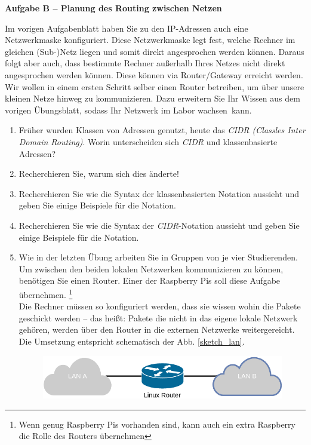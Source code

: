 \documentclass[paper=a4,fontsize=11pt]{scrartcl}%
\numberwithin{equation}{section}
\begin{document}
\begin{center}
\Large{\textbf{Aufgabe B -- Planung des Routing zwischen Netzen}}
\end{center}
\vskip0.25in
Im vorigen Aufgabenblatt haben Sie zu den IP-Adressen auch eine Netzwerkmaske konfiguriert. Diese Netzwerkmaske legt fest, welche Rechner im gleichen (Sub-)Netz liegen und somit direkt angesprochen werden können. Daraus folgt aber auch, dass bestimmte Rechner außerhalb Ihres Netzes nicht direkt angesprochen werden können. Diese können via Router/Gateway erreicht werden.\\
Wir wollen in einem ersten Schritt selber einen Router betreiben, um über unsere kleinen Netze hinweg zu kommunizieren. Dazu erweitern Sie Ihr Wissen aus dem vorigen Übungsblatt, sodass Ihr Netzwerk im Labor \glqq wachsen\grqq\ kann.
\begin{enumerate}
	\item Früher wurden Klassen von Adressen genutzt, heute das \emph{CIDR (Classles Inter Domain Routing)}. Worin unterscheiden sich \emph{CIDR} und klassenbasierte Adressen?
	\item Recherchieren Sie, warum sich dies änderte!
	\item Recherchieren Sie wie die Syntax der klassenbasierten Notation aussieht und geben Sie einige Beispiele für die Notation.
	\item Recherchieren Sie wie die Syntax der \emph{CIDR}-Notation aussieht und geben Sie einige Beispiele für die Notation.
	\item Wie in der letzten Übung arbeiten Sie in Gruppen von je vier Studierenden.\\
	Um zwischen den beiden lokalen Netzwerken kommunizieren zu können, benötigen Sie einen Router. Einer der Raspberry Pis  soll diese Aufgabe übernehmen. \footnote{Wenn genug Raspberry Pis vorhanden sind, kann auch ein extra Raspberry die Rolle des Routers übernehmen}\\
	Die Rechner müssen so konfiguriert werden, dass sie wissen wohin die Pakete geschickt werden -- das heißt: Pakete die nicht in das eigene lokale Netzwerk gehören, werden über den Router in die externen Netzwerke weitergereicht. Die Umsetzung entspricht schematisch der Abb. \ref{sketch_lan}.
	\begin{figure}[H]
	\centering
	\includegraphics[scale=0.35]{lan}

\end{figure}
\end{enumerate}
\end{document}
